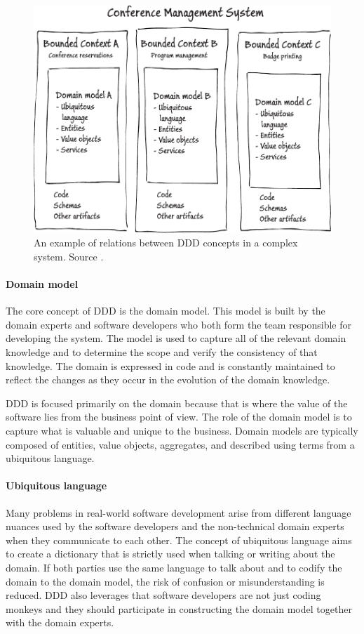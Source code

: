 \documentclass{book}
\begin{document}
\begin{figure}[h!]
\begin{center}
\includegraphics[width=0.7\columnwidth]{figures/ddd/ddd}
\caption{An example of relations between DDD concepts in a complex system. Source
\cite{journey}.%
}
\end{center}
\end{figure}

\paragraph{Domain model}\label{domain-model}

The core concept of DDD is the domain model. This model is built by the
domain experts and software developers who both form the team
responsible for developing the system. The model is used to capture all
of the relevant domain knowledge and to determine the scope and verify
the consistency of that knowledge. The domain is expressed in code and
is constantly maintained to reflect the changes as they occur in the
evolution of the domain knowledge.

DDD is focused primarily on the domain because that is where the value
of the software lies from the business point of view. The role of the
domain model is to capture what is valuable and unique to the business.
Domain models are typically composed of entities, value objects,
aggregates, and described using terms from a ubiquitous language.

\paragraph{Ubiquitous language}\label{ubiquitous-language}

Many problems in real-world software development arise from different
language nuances used by the software developers and the non-technical
domain experts when they communicate to each other. The concept of
ubiquitous language aims to create a dictionary that is strictly used
when talking or writing about the domain. If both parties use the same
language to talk about and to codify the domain to the domain model, the
risk of confusion or misunderstanding is reduced. DDD also leverages
that software developers are not just coding monkeys and they should
participate in constructing the domain model together with the domain
experts.
\end{document}
